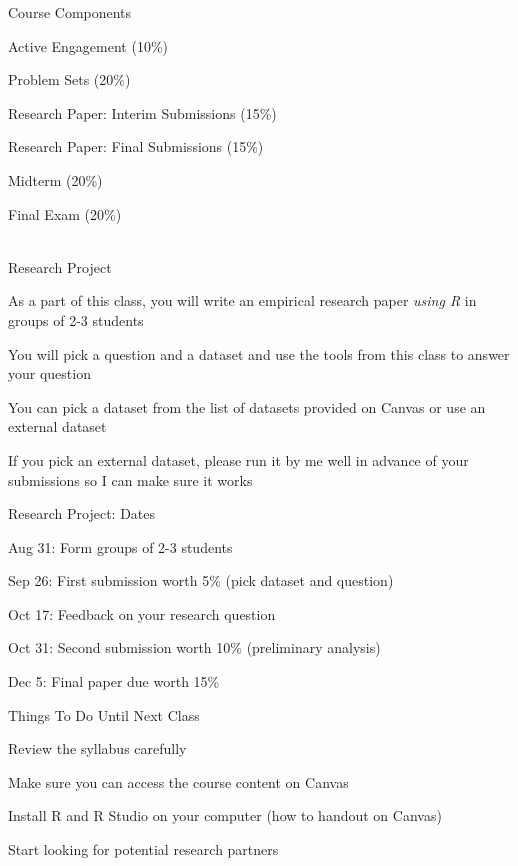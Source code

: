 \documentclass{./../div_teaching_slides}
\begin{document}
\begin{frame}{Course Components}
\begin{witemize}
\item Active Engagement (10\%)
\item Problem Sets (20\%)
\item Research Paper: Interim Submissions (15\%)
\item Research Paper: Final Submissions (15\%)
\item Midterm (20\%)
\item Final Exam (20\%) \\~\\
\end{witemize}
\end{frame}

\begin{frame}{Research Project}
\begin{witemize}
\item As a part of this class, you will write an empirical research paper \textit{using R} in groups of 2-3 students 
\item You will pick a question and a dataset and use the tools from this class to answer your question 
\item You can pick a dataset from the list of datasets provided on Canvas or use an external dataset 
\item If you pick an external dataset, please run it by me well in advance of your submissions so I can make sure it works
\end{witemize}
\end{frame}

\begin{frame}{Research Project: Dates}
\begin{witemize}
\item Aug 31: Form groups of 2-3 students 
\item Sep 26: First submission worth 5\% (pick dataset and question)
\item Oct 17: Feedback on your research question
\item Oct 31: Second submission worth 10\% (preliminary analysis)
\item Dec 5: Final paper due worth 15\%
\end{witemize}
\end{frame}

\begin{frame}{Things To Do Until Next Class}
\begin{wenumerate}
\item Review the syllabus carefully
\item Make sure you can access the course content on Canvas 
\item Install R and R Studio on your computer (how to handout on Canvas)
\item Start looking for potential research partners \\
\end{wenumerate}
\end{frame}
\end{document}
